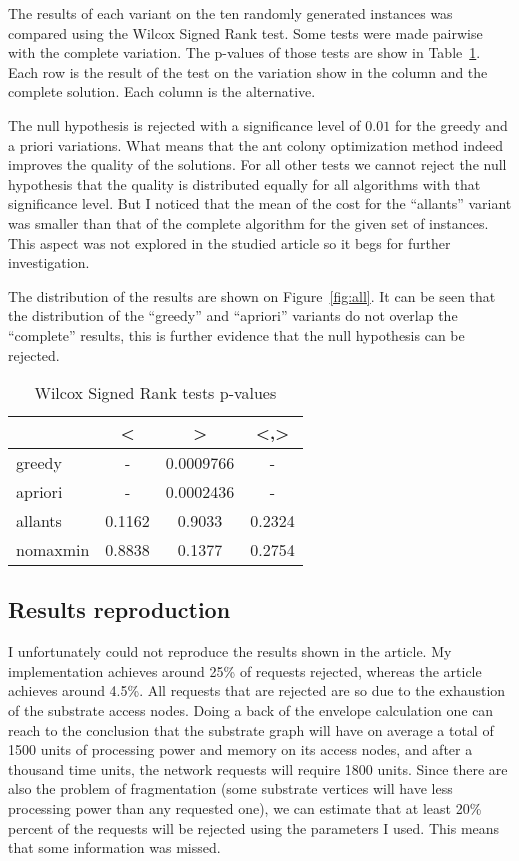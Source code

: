 \documentclass[10pt, a4paper, twocolumn]{article}
\begin{document}
The results of each variant on the ten randomly generated instances was compared using the Wilcox Signed Rank test. Some tests were made pairwise with the complete variation. The p-values of those tests are show in Table~\ref{tab:all}. Each row is the result of the test on the variation show in the column and the complete solution. Each column is the alternative.

The null hypothesis is rejected with a significance level of $0.01$ for the greedy and a priori variations. What means that the ant colony optimization method indeed improves the quality of the solutions. For all other tests we cannot reject the null hypothesis that the quality is distributed equally for all algorithms with that significance level. But I noticed that the mean of the cost for the ``allants'' variant was smaller than that of the complete algorithm for the given set of instances. This aspect was not explored in the studied article so it begs for further investigation.

The distribution of the results are shown on Figure~\ref{fig:all}. It can be seen that the distribution of the ``greedy'' and ``apriori'' variants do not overlap the ``complete'' results, this is further evidence that the null hypothesis can be rejected.

\begin{table}[!h]
  \begin{tabular}{l | c c c }
                &  <      & >         & <,> \\
  \hline
      greedy    &  -      & 0.0009766 & - \\
      apriori   &  -      & 0.0002436 & - \\
      allants   &  0.1162 & 0.9033    & 0.2324 \\
      nomaxmin  &  0.8838 & 0.1377    & 0.2754 \\
  \end{tabular}
  \caption{Wilcox Signed Rank tests p-values}
  \label{tab:all}
\end{table}


\subsection{Results reproduction}
I unfortunately could not reproduce the results shown in the article. My implementation achieves around 25\% of requests rejected, whereas the article achieves around 4.5\%. All requests that are rejected are so due to the exhaustion of the substrate access nodes. Doing a back of the envelope calculation one can reach to the conclusion that the substrate graph will have on average a total of 1500 units of processing power and memory on its access nodes, and after a thousand time units, the network requests will require 1800 units. Since there are also the problem of fragmentation (some substrate vertices will have less processing power than any requested one), we can estimate that at least 20\% percent of the requests will be rejected using the parameters I used. This means that some information was missed.
\end{document}
